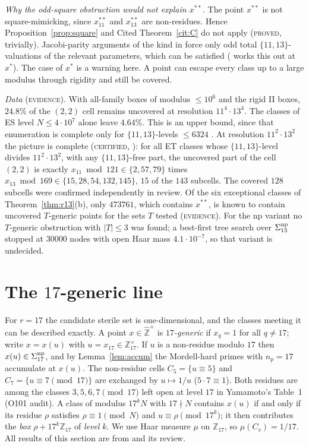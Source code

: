 \documentclass[11pt,reqno]{amsart}
\theoremstyle{definition}
\newcommand{\Z}{\mathbb Z}
\newcommand{\Zhu}{\widehat{\Z}^{\times}}
\newcommand{\status}[1]{\textup{\textsc{#1}}}
\begin{document}
\emph{Why the odd-square obstruction would not explain $x^{**}$.}  The
point $x^{**}$ is not square-mimicking, since $x^{**}_{11}$ and
$x^{**}_{13}$ are non-residues.  Hence Proposition~\ref{prop:square} and
Cited Theorem~\ref{cit:C} do not apply (\status{proved}, trivially).
Jacobi-parity arguments of the kind in \cite[Prop.~1.6]{ET} force only
odd total $\{11,13\}$-valuations of the relevant parameters, which can be
satisfied (\cite[Lemma~1.2]{PM13B} works this out at $x^*$).  The case of
$x^*$ is a warning here.  A point can escape every class up to a large
modulus through rigidity and still be covered.

\emph{Data} (\status{evidence}).  With all-family boxes of modulus
$\le10^6$ and the rigid II boxes, $24.8\%$ of the $(2,2)$ cell remains
uncovered at resolution $11^4\cdot13^4$.  The classes of ES level
$N\le4\cdot10^7$ alone leave $4.64\%$.  This is an upper bound,
since that enumeration is complete only for $\{11,13\}$-levels
$\le6324$ \cite[\S4]{PM13B}.  At resolution $11^2\cdot13^2$ the picture
is complete (\status{certified}, \cite[Comp.~3.1]{PM13C}): for all ET
classes whose $\{11,13\}$-level divides $11^2\cdot13^2$, with any
$\{11,13\}$-free part, the uncovered part of the cell $(2,2)$ is exactly
$x_{11}\bmod121\in\{2,57,79\}$ times $x_{13}\bmod169\in\{15,28,54,132,145\}$,
$15$ of the $143$ subcells.  The covered $128$ subcells were confirmed
independently in review.  Of the six exceptional classes of
Theorem~\ref{thm:r13}(b), only $473761$, which contains $x^{**}$, is known
to contain uncovered $T$-generic points for the sets $T$ tested
\cite[\S3]{PM13C} (\status{evidence}).  For the np variant no $T$-generic obstruction with
$|T|\le3$ was found; a best-first tree search over $\Sigma_{13}^{\rm np}$
stopped at $30000$ nodes with open Haar mass $4.1\cdot10^{-7}$, so that
variant is undecided.

\section{The $17$-generic line}\label{sec:r17}

For $r=17$ the candidate sterile set is one-dimensional, and the classes
meeting it can be described exactly.  A point $x\in\Zhu$ is
\emph{$17$-generic} if $x_q=1$ for all $q\ne17$; write $x=x(u)$ with
$u=x_{17}\in\Z_{17}^\times$.  If $u$ is a non-residue modulo $17$ then
$x(u)\in\Sigma_{17}^{\rm np}$, and by Lemma~\ref{lem:accum} the
Mordell-hard primes with $n_p=17$ accumulate at $x(u)$.  The non-residue
cells $C_5=\{u\equiv5\}$ and $C_7=\{u\equiv7\pmod{17}\}$ are exchanged by
$u\mapsto1/u$ ($5\cdot7\equiv1$).  Both residues are among the classes
$3,5,6,7\pmod{17}$ left open at level $17$ in Yamamoto's Table~1
\cite[p.~44]{Yamamoto} (O101 audit).  A class of modulus $17^kN$ with
$17\nmid N$ contains $x(u)$ if and only if its residue $\rho$ satisfies
$\rho\equiv1\pmod N$ and $u\equiv\rho\pmod{17^k}$; it then contributes the
\emph{box} $\rho+17^k\Z_{17}$ of \emph{level} $k$.  We use Haar measure
$\mu$ on $\Z_{17}$, so $\mu(C_v)=1/17$.  All results of this section are
from \cite{PM17} and its review.
\end{document}
